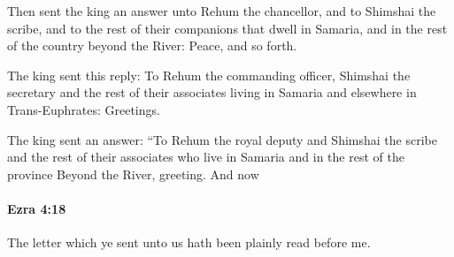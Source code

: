 			\begin{versebox}
					\item[BHS] 
					\item[LXX] 
					\item[ASV] Then sent the king an answer unto Rehum the chancellor, and to Shimshai the scribe, and to the rest of their companions that dwell in Samaria, and in the rest of the country beyond the River: Peace, and so forth.
					\item[NIV] The king sent this reply: To Rehum the commanding officer, Shimshai the secretary and the rest of their associates living in Samaria and elsewhere in Trans-Euphrates: Greetings.
					\item[NRSV] The king sent an answer: “To Rehum the royal deputy and Shimshai the scribe and the rest of their associates who live in Samaria and in the rest of the province Beyond the River, greeting. And now
			\end{versebox}

		\paragraph{Ezra 4:18} %
			\label{EZRA-4-18}

			The letter which ye sent unto us hath been plainly read before me.

